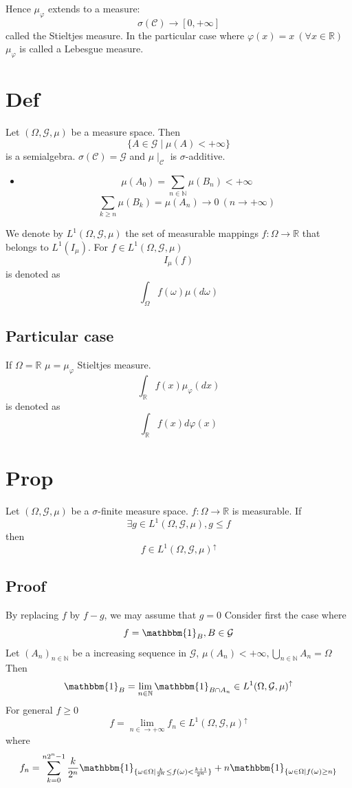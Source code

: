 \documentclass{book}
\begin{document}
Hence $\mu_\varphi$ extends to a measure:$$\sigma(\mathcal{C})\rightarrow[0,+\infty]$$called the Stieltjes measure. In the particular case where $\varphi(x)=x\ (\forall x\in\mathbb{R})$ $\mu_\varphi$ is called a Lebesgue measure.
\section{Def}
Let $(\Omega,\mathcal{G},\mu)$ be a measure space. Then $$\{A\in \mathcal{G}\mid\mu(A)<+\infty\}$$ is a semialgebra. $\sigma(\mathcal{C})=\mathcal{G}$ and $\mu\mid_\mathcal{C}$ is $\sigma$-additive.
\begin{itemize}
    \item $$\mu(A_0)=\sum\limits_{n\in \mathbb{N}}\mu(B_n)<+\infty$$
    $$\sum\limits_{k\geq n}\mu(B_k)=\mu(A_n)\rightarrow 0\ (n\rightarrow+\infty)$$
\end{itemize}
We denote by $L^1(\Omega,\mathcal{G},\mu)$ the set of measurable mappings $f:\Omega\rightarrow\mathbb{R}$ that belongs to $L^1(I_\mu)$. For $f\in  L^1(\Omega,\mathcal{G},\mu)$ $$I_\mu(f)$$ is denoted as $$\int_\Omega f(\omega)\mu(d\omega)$$
\subsection{Particular case}
If $\Omega=\mathbb{R}$ $\mu=\mu_\varphi$ Stieltjes measure.$$\int_\mathbb{R}f(x)\mu_\varphi(dx)$$ is denoted as$$\int_\mathbb{R}f(x)d\varphi(x)$$
\section{Prop}
Let $(\Omega,\mathcal{G},\mu)$ be a $\sigma$-finite measure space. $f:\Omega\rightarrow\mathbb{R}$ is measurable. If $$\exists g\in L^1(\Omega,\mathcal{G},\mu),g\leq f$$ then $$f\in L^1(\Omega,\mathcal{G},\mu)^\uparrow$$ 
\subsection*{Proof}
By replacing $f$ by $f-g$, we may assume that $g=0$ Consider first the case where $$f=\mathbbm{1}_B,B\in \mathcal{G}$$
Let $(A_n)_{n\in \mathbb{N}}$ be a increasing sequence in $\mathcal{G}$, $\mu(A_n)<+\infty,\bigcup\limits_{n\in \mathbb{N}}A_n=\Omega$
Then $$\mathbbm{1}_B=\lim\limits_{n\in \mathbb{N}}\mathbbm{1}_{B\cap A_n}\in L^1(\Omega,\mathcal{G},\mu)^\uparrow$$
For general $f\geq0$ $$f=\lim\limits_{n\in \rightarrow+\infty}f_n\in L^1(\Omega,\mathcal{G},\mu)^\uparrow$$ where
$$f_n=\sum\limits_{k=0}^{n2^n-1}\frac{k}{2^n}\mathbbm{1}_{\{\omega\in \Omega\mid\frac{k}{2^n}\leq f(\omega)<\frac{k+1}{2^n}\}}+n\mathbbm{1}_{\{\omega\in \Omega\mid f(\omega)\geq n\}}$$
\end{document}
